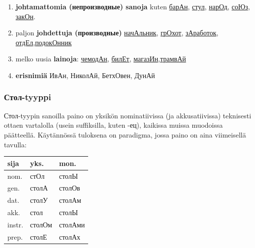 \documentclass[]{scrreprt}
\providecommand{\tightlist}{%
  \setlength{\itemsep}{0pt}\setlength{\parskip}{0pt}}
\begin{document}
\begin{enumerate}
\def\labelenumi{\arabic{enumi}.}
\tightlist
\item
  \textbf{johtamattomia (непроизводные) sanoja} kuten
  \href{http://ru.wiktionary.org/wiki/\%D0\%B1\%D0\%B0\%D1\%80\%D0\%B0\%D0\%BD}{барАн},
  \href{http://ru.wiktionary.org/wiki/\%D1\%81\%D1\%82\%D1\%83\%D0\%BB}{стул},
  \href{http://ru.wiktionary.org/wiki/\%D0\%BD\%D0\%B0\%D1\%80\%D0\%BE\%D0\%B4}{нарОд},
  \href{http://ru.wiktionary.org/wiki/\%D1\%81\%D0\%BE\%D1\%8E\%D0\%B7}{соЮз},
  \href{http://ru.wiktionary.org/wiki/\%D0\%B7\%D0\%B0\%D0\%BA\%D0\%BE\%D0\%BD}{закОн}.
\item
  paljon \textbf{johdettuja (производные)}
  \href{http://ru.wiktionary.org/wiki/\%D0\%BD\%D0\%B0\%D1\%87\%D0\%B0\%D0\%BB\%D1\%8C\%D0\%BD\%D0\%B8\%D0\%BA}{начАльник},
  \href{http://ru.wiktionary.org/wiki/\%D0\%B3\%D1\%80\%D0\%BE\%D1\%85\%D0\%BE\%D1\%82}{грОхот},
  \href{http://ru.wiktionary.org/wiki/\%D0\%B7\%D0\%B0\%D1\%80\%D0\%B0\%D0\%B1\%D0\%BE\%D1\%82\%D0\%BE\%D0\%BA}{зАработок},
  \href{http://ru.wiktionary.org/wiki/\%D0\%BE\%D1\%82\%D0\%B4\%D0\%B5\%D0\%BB}{отдЕл},\href{http://ru.wiktionary.org/wiki/\%D0\%BF\%D0\%BE\%D0\%B4\%D0\%BE\%D0\%BA\%D0\%BE\%D0\%BD\%D0\%BD\%D0\%B8\%D0\%BA}{подокОнник}
\item
  melko uusia \textbf{lainoja}:
  \href{http://ru.wiktionary.org/wiki/\%D1\%87\%D0\%B5\%D0\%BC\%D0\%BE\%D0\%B4\%D0\%B0\%D0\%BD}{чемодАн},
  \href{http://ru.wiktionary.org/wiki/\%D0\%B1\%D0\%B8\%D0\%BB\%D0\%B5\%D1\%82}{билЕт},
  \href{http://ru.wiktionary.org/wiki/\%D0\%BC\%D0\%B0\%D0\%B3\%D0\%B0\%D0\%B7\%D0\%B8\%D0\%BD}{магазИн},\href{http://ru.wiktionary.org/wiki/\%D1\%82\%D1\%80\%D0\%B0\%D0\%BC\%D0\%B2\%D0\%B0\%D0\%B9}{трамвАй}
\item
  \textbf{erisnimiä} ИвАн, НиколАй, БетхОвен, ДунАй
\end{enumerate}

\subsubsection{Стол-tyyppi}\label{ux441ux442ux43eux43b-tyyppi}

Стол-tyypin sanoilla paino on yksikön nominatiivissa (ja akkusatiivissa)
teknisesti ottaen vartalolla (usein suffiksilla, kuten -ец), kaikissa
muissa muodoissa päätteellä. Käytännössä tuloksena on paradigma, jossa
paino on aina viimeisellä tavulla:

\begin{longtable}[c]{@{}lll@{}}
\toprule
sija & yks. & mon.\tabularnewline
\midrule
\endhead
nom. & стОл & столЫ\tabularnewline
gen. & столА & столОв\tabularnewline
dat. & столУ & столАм\tabularnewline
akk. & стол & столЫ\tabularnewline
instr. & столОм & столАми\tabularnewline
prep. & столЕ & столАх\tabularnewline
\bottomrule
\end{longtable}
\end{document}
